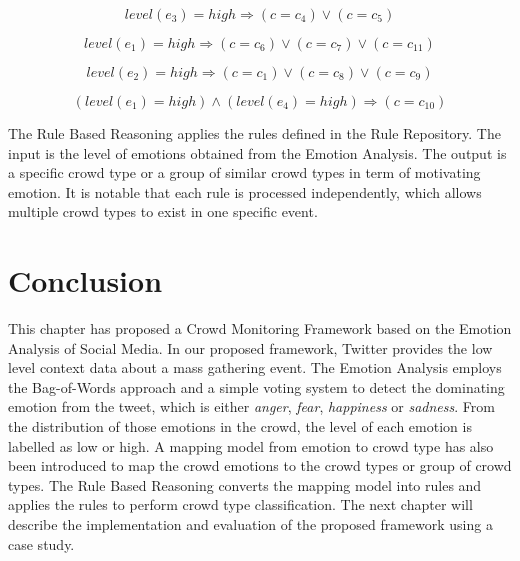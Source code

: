 \begin{equation}
\label{eq:rule2}
	level(e_3) = high \Rightarrow (c = c_4) \lor (c = c_5)
\end{equation}

\begin{equation}
\label{eq:rule3}
	level(e_1) = high \Rightarrow (c = c_6) \lor (c = c_7) \lor (c = c_{11})
\end{equation}

\begin{equation}
\label{eq:rule4}
	level(e_2) = high \Rightarrow (c = c_1) \lor (c = c_8) \lor (c = c_9)
\end{equation}

\begin{equation}
\label{eq:rule5}
	(level(e_1) = high) \land (level(e_4) = high) \Rightarrow (c = c_{10})
\end{equation}

The Rule Based Reasoning applies the rules defined in the Rule Repository. The input is the level of emotions obtained from the Emotion Analysis. The output is a specific crowd type or a group of similar crowd types in term of motivating emotion. It is notable that each rule is processed independently, which allows multiple crowd types to exist in one specific event.

\section{Conclusion}
This chapter has proposed a Crowd Monitoring Framework based on the Emotion Analysis of Social Media. In our proposed framework, Twitter provides the low level context data about a mass gathering event. The Emotion Analysis employs the Bag-of-Words approach and a simple voting system to detect the dominating emotion from the tweet, which is either \textit{anger}, \textit{fear}, \textit{happiness} or \textit{sadness}. From the distribution of those emotions in the crowd, the level of each emotion is labelled as low or high. A mapping model from emotion to crowd type has also been introduced to map the crowd emotions to the crowd types or group of crowd types. The Rule Based Reasoning converts the mapping model into rules and applies the rules to perform crowd type classification. The next chapter will describe the implementation and evaluation of the proposed framework using a case study.